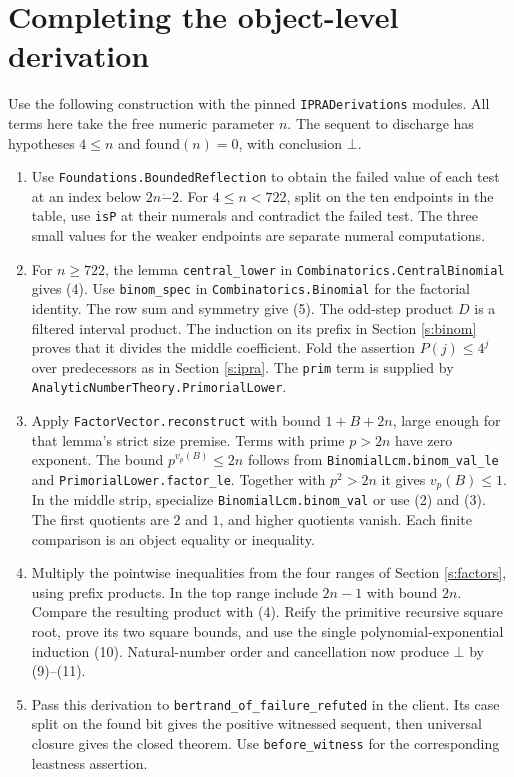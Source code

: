 \documentclass[12pt,letterpaper]{article}
\newcommand{\dotminus}{\mathbin{\dot{-}}}
\newcommand{\code}[1]{\texttt{\small #1}}
\newcommand{\pagepart}{\clearpage}
\begin{document}
\pagepart\section*{Completing the object-level derivation}
Use the following construction with the pinned \code{IPRADerivations} modules. All terms here take the free numeric parameter \(n\). The sequent to discharge has hypotheses \(4\le n\) and \(\mathrm{found}(n)=0\), with conclusion \(\bot\).
\begin{enumerate}
\item Use \code{Foundations.BoundedReflection} to obtain the failed value of each test at an index below \(2n\dotminus2\). For \(4\le n<722\), split on the ten endpoints in the table, use \code{isP} at their numerals and contradict the failed test. The three small values for the weaker endpoints are separate numeral computations.
\item For \(n\ge722\), the lemma \code{central\_lower} in \code{Combinatorics.CentralBinomial} gives (4). Use \code{binom\_spec} in \code{Combinatorics.Binomial} for the factorial identity. The row sum and symmetry give (5). The odd-step product \(D\) is a filtered interval product. The induction on its prefix in Section \ref{s:binom} proves that it divides the middle coefficient. Fold the assertion \(P(j)\le4^j\) over predecessors as in Section \ref{s:ipra}. The \code{prim} term is supplied by \code{AnalyticNumberTheory.PrimorialLower}.
\item Apply \code{FactorVector.reconstruct} with bound \(1+B+2n\), large enough for that lemma's strict size premise. Terms with prime \(p>2n\) have zero exponent. The bound \(p^{v_p(B)}\le 2n\) follows from \code{BinomialLcm.binom\_val\_le} and \code{PrimorialLower.factor\_le}. Together with \(p^2>2n\) it gives \(v_p(B)\le1\). In the middle strip, specialize \code{BinomialLcm.binom\_val} or use (2) and (3). The first quotients are \(2\) and \(1\), and higher quotients vanish. Each finite comparison is an object equality or inequality.
\item Multiply the pointwise inequalities from the four ranges of Section \ref{s:factors}, using prefix products. In the top range include \(2n-1\) with bound \(2n\). Compare the resulting product with (4). Reify the primitive recursive square root, prove its two square bounds, and use the single polynomial-exponential induction (10). Natural-number order and cancellation now produce \(\bot\) by (9)--(11).
\item Pass this derivation to \code{bertrand\_of\_failure\_refuted} in the client. Its case split on the found bit gives the positive witnessed sequent, then universal closure gives the closed theorem. Use \code{before\_witness} for the corresponding leastness assertion.
\end{enumerate}
\end{document}
